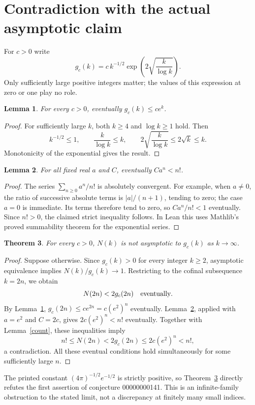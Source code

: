 \documentclass[11pt]{article}
\newtheorem{theorem}{Theorem}
\newtheorem{lemma}[theorem]{Lemma}
\begin{document}
\clearpage
\section{Contradiction with the actual asymptotic claim}
For $c>0$ write
\[
 g_c(k)=c\,k^{-1/2}\exp\!\left(2\sqrt{\frac{k}{\log k}}\right).
\]
Only sufficiently large positive integers matter; the values of this expression at zero or one play no role.

\begin{lemma}\label{upper}
For every $c>0$, eventually $g_c(k)\leq c e^k$.
\end{lemma}
\begin{proof}
For sufficiently large $k$, both $k\geq4$ and $\log k\geq1$ hold. Then
\[
 k^{-1/2}\leq1,\qquad
 \frac{k}{\log k}\leq k,\qquad
 2\sqrt{\frac{k}{\log k}}\leq2\sqrt{k}\leq k.
\]
Monotonicity of the exponential gives the result.
\end{proof}

\begin{lemma}\label{factorial}
For all fixed real $a$ and $C$, eventually $Ca^n<n!$.
\end{lemma}
\begin{proof}
The series $\sum_{n\geq0}a^n/n!$ is absolutely convergent. For example, when $a\ne0$, the ratio of successive absolute terms is $|a|/(n+1)$, tending to zero; the case $a=0$ is immediate. Its terms therefore tend to zero, so $Ca^n/n!<1$ eventually. Since $n!>0$, the claimed strict inequality follows. In Lean this uses Mathlib's proved summability theorem for the exponential series.
\end{proof}

\begin{theorem}\label{disproof}
For every $c>0$, $N(k)$ is not asymptotic to $g_c(k)$ as $k\to\infty$.
\end{theorem}
\begin{proof}
Suppose otherwise. Since $g_c(k)>0$ for every integer $k\geq2$, asymptotic equivalence implies $N(k)/g_c(k)\to1$. Restricting to the cofinal subsequence $k=2n$, we obtain
\[
 N(2n)<2g_c(2n)\quad\hbox{eventually}.
\]
By Lemma~\ref{upper}, $g_c(2n)\leq c e^{2n}=c(e^2)^n$ eventually. Lemma~\ref{factorial}, applied with $a=e^2$ and $C=2c$, gives $2c(e^2)^n<n!$ eventually. Together with Lemma~\ref{count}, these inequalities imply
\[
 n!\leq N(2n)<2g_c(2n)\leq2c(e^2)^n<n!,
\]
a contradiction. All these eventual conditions hold simultaneously for some sufficiently large $n$.
\end{proof}
The printed constant $(4\pi)^{-1/2}e^{-1/2}$ is strictly positive, so Theorem~\ref{disproof} directly refutes the first assertion of conjecture 00000000141. This is an infinite-family obstruction to the stated limit, not a discrepancy at finitely many small indices.
\end{document}
